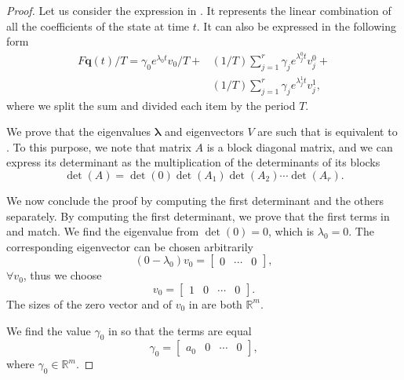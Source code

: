 \begin{proof}
Let us consider the expression in . It represents the linear combination of all the coefficients of the state at time $t$. It can also be expressed in the following form
\begin{equation}\label{eq:proof-output}\begin{split}
  F\mathbf{q}(t)/T=\gamma_0 e^{\lambda_0t}v_0/T+&(1/T)\sum_{j=1}^r{\gamma_j e^{\lambda_j^0t}v_j^0}+\\&(1/T)\sum_{j=1}^r{\gamma_j e^{\lambda_j^1t}v_j^1},
\end{split}\end{equation}
where we split the sum and divided each item by the period $T$.

We prove that the eigenvalues $\mathbf{\lambda}$ and eigenvectors $V$ are such that  is equivalent to .
To this purpose, we note that matrix $A$ is a block diagonal matrix, and we can express its determinant as the multiplication of the determinants of its blocks
\begin{equation}
  \det{(A)}=\det{(0)}\det{(A_1)}\det{(A_2)}\cdots\det{(A_r)}.
\end{equation}

We now conclude the proof by computing the first determinant and the others separately.
By computing the first determinant, we prove that the first terms in  and  match. We find the eigenvalue from $\det(0)=0$, which is $\lambda_0=0$. The corresponding eigenvector can be chosen arbitrarily
\begin{equation}\label{eq:proof-first-det}
  (0-\lambda_0)v_0=\begin{bmatrix} 0 & \cdots & 0 \end{bmatrix},
\end{equation}
$\forall v_0$, thus we choose
\begin{equation}\label{eq:proof-v0}
  v_0=\begin{bmatrix}1 & 0 & \cdots & 0\end{bmatrix}.
\end{equation}
The sizes of the zero vector and of $v_0$ in  are both $\mathbb{R}^m$.

We find the value $\gamma_0$ in  so that the terms are equal 
\begin{equation}
  \gamma_0=\begin{bmatrix}a_0 & 0 & \cdots & 0\end{bmatrix},
\end{equation} 
where $\gamma_0\in\mathbb{R}^m$.


\end{proof}
